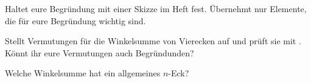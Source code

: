 \documentclass[11pt, a4paper]{arbeitsblatt}
\begin{document}
\begin{aufgabe}[icon=\iconStift\,\iconPartner]
	\label{aufg:beweis-notieren}
	Haltet eure Begründung mit einer Skizze im Heft fest. Übernehmt nur Elemente,
	die für eure Begründung wichtig sind.
\end{aufgabe}

\begin{wrapfix}
\begin{figure}
\end{figure}
\begin{aufgabe*}[icon=\iconTablet\,\iconPartner]
	\label{aufg:n-ecke}
	Stellt Vermutungen für die Winkelsumme von Vierecken auf
	und prüft sie mit . Könnt ihr eure Vermutungen auch
	Begründunden?

	Welche Winkelsumme hat ein allgemeines $n$-Eck?

\end{aufgabe*}
\end{wrapfix}
\end{document}
